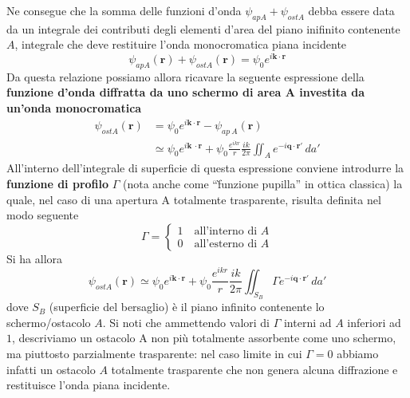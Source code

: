 Ne consegue che la somma delle funzioni d'onda $\psi_{ap A}+ \psi_{ost A}$ debba essere data da un integrale dei contributi degli elementi d'area del
piano inifinito contenente $A$, integrale che deve restituire l'onda monocromatica piana incidente
\[
	\psi_{ap A}(\bm{r})+ \psi_{ost A}(\bm{r}) = \psi_0 e^{i \bm{k} \cdot \bm{r}}
\]
Da questa relazione possiamo allora ricavare la seguente espressione della \textbf{funzione d'onda diffratta da uno schermo di area A investita da un'onda monocromatica}
\begin{align}
	    \psi_{ost A}(\bm{r}) & =  \psi_0 e^{i \bm{k} \cdot \bm{r}}- \psi_{ap \  A}(\bm{r}) \nonumber \\
		 & \simeq \psi_0 e^{i \bm{k} \
		\cdot \bm{r}} + \psi_0 \frac{e^{ikr}}{r} \frac{ik}{2 \pi} \iint_{A}e^{-i \bm{q} \cdot \bm{r'}} \, da'
		\label{eq:screen-scattered-wave}
\end{align}
All'interno dell'integrale di superficie di questa espressione conviene introdurre la \textbf{funzione di profilo}
$\Gamma$ (nota anche come ``f̀unzione pupilla'' in ottica classica) la quale, nel caso di una apertura A totalmente trasparente, risulta definita nel modo seguente
\[
	\Gamma =
	\begin{cases}
		1   \quad \text{all'interno di } A \\
		0  \quad \text{all'esterno di } A
	\end{cases}
\]
Si ha allora
\[
	\psi_{ost A}(\bm{r}) \simeq \psi_0e^{i \bm{k} \cdot \bm{r}} + \psi_0 \frac{e^{ikr}}{r} \frac{ik}{2 \pi} \iint_{S_B} \Gamma e^{-i \bm{q} \cdot \bm{r'}} \, da'
\]
dove $S_B$ (superficie del bersaglio) è il piano infinito contenente lo schermo/ostacolo $A$.
Si noti che ammettendo valori di $\Gamma$ interni ad $A$ inferiori ad $1$, descriviamo un ostacolo A non più totalmente
assorbente come uno schermo, ma piuttosto parzialmente trasparente: nel caso limite in cui $\Gamma = 0$ abbiamo infatti un ostacolo $A$ totalmente trasparente che non genera alcuna diffrazione e restituisce l'onda piana incidente.

